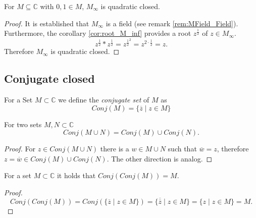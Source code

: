 \begin{lemma}
    \label{lem:M_inf_quad_closed}
    \leanok
    For $M\subseteq \mathbb{C}$ with $0,1 \in M$, $M_{\infty}$ is quadratic closed.
\end{lemma}
\begin{proof}
    It is established that $M_{\infty}$ is a field (see remark \ref{rem:MField_Field}). Furthermore, the corollary \ref{cor:root_M_inf} provides a root $z^{\frac{1}{2}}$ of $z \in M_{\infty}$.    
    $$ z^{\frac{1}{2}} * z^{\frac{1}{2}} = z^{\frac{1}{2}^2} = z^{2\cdot \frac{1}{2}} = z.$$
    Therefore $M_{\infty}$ is quadratic closed.
\end{proof}

\subsection*{Conjugate closed}
\begin{definition}
    \label{def:conj_set}
    \leanok
    For a Set $M \subset \mathbb{C}$ we define the \emph{conjugate set} of $M$ as 
    \begin{equation*}
        Conj(M) = \{\overline{z}\mid z\in M\}
    \end{equation*}
\end{definition}

\begin{lemma}
    \label{lem:conj_union}
    \leanok
    For two sets $M,N \subset \mathbb{C}$ $$Conj(M\cup N) = Conj(M) \cup Conj(N).$$
\end{lemma}
\begin{proof}
    For $z \in Conj(M\cup N)$ there is a $w \in M\cup N$ such that $\overline{w} = z$, therefore $ z = \overline{w} \in Conj(M) \cup Conj(N)$. The other direction is analog.
\end{proof}

\begin{lemma}
    \label{lem:conj_conj_id}
    \leanok
    For a set $M \subset \mathbb{C}$ it holds that $Conj(Conj(M)) = M$.
\end{lemma}
\begin{proof}
    $$Conj(Conj(M)) = Conj(\{\overline{z}\mid z\in M\}) = \{\overline{\overline{z}}\mid z\in M\} = \{ z \mid z\in M\} = M.$$
\end{proof}

